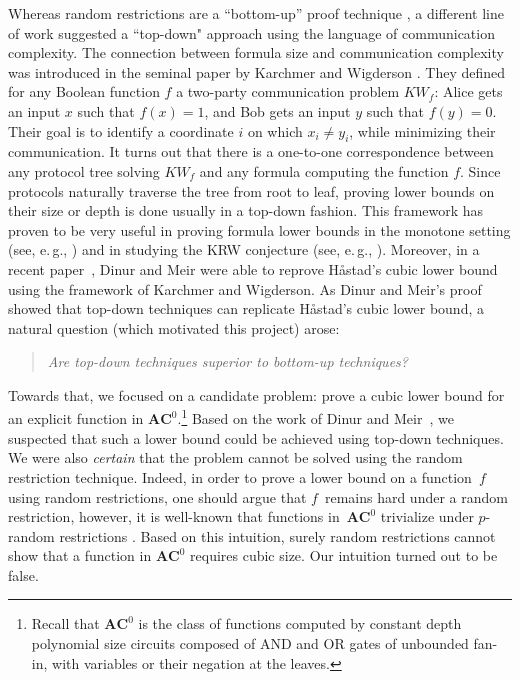 \documentclass[11pt]{article}
\numberwithin{equation}{section}
\theoremstyle{definition}
\theoremstyle{plain}
\newcommand{\eg}{e.\,g.}
\theoremstyle{definition}\newtheorem{notation}[theorem]{Notation}\theoremstyle{plain}
\newcommand{\ACz}{\boldsymbol{AC}^{0}}
\newcommand{\KW}{\mathit{KW}}
\theoremstyle{definition}
\theoremstyle{plain}
\begin{document}
Whereas random restrictions are a ``bottom-up'' proof technique
\cite{HJP95}, a different line of work suggested a ``top-down"
approach using the language of communication complexity. The connection
between formula size and communication complexity was introduced in
the seminal %
paper by %
Karchmer and Wigderson \cite{KW90}. They defined
for any Boolean function $f$ a two-party communication problem $\KW_{f}$:
Alice gets an input $x$ such that $f(x)=1$, and Bob gets an input
$y$ such that $f(y)=0$. Their goal is to identify a coordinate $i$
on which $x_{i}\neq y_{i}$, while minimizing their communication.
It turns out that there is a one-to-one correspondence between any
protocol tree solving $\KW_{f}$ and any formula computing the function
$f$. Since protocols naturally traverse the tree from root to leaf,
proving lower bounds on their size or depth is done usually in a top-down
fashion. This framework has proven to be very useful in proving formula
lower bounds in the monotone setting (see, \eg, \cite{KW90,GH92,RW92,KRW95,RM99,GP18,PR17})
and in studying the KRW conjecture (see, \eg, \cite{KRW95,EIRS01,HW93,GMWW17,DM18,KM18,M20,RMNPR20,MS21}).
Moreover,
%
in a recent paper~\cite{DM18}, Dinur and Meir were able to %
reprove H{\aa}stad's cubic lower bound using the framework of Karchmer
and Wigderson. As Dinur and Meir's proof showed that top-down techniques
can replicate H{\aa}stad's cubic lower bound, a natural question
(which motivated this project) arose: 
\begin{quote}
\emph{Are top-down techniques superior to bottom-up techniques?} 
\end{quote}
Towards that, we focused on a candidate problem: prove a cubic lower
bound for an explicit function in $\ACz$.\footnote{Recall that $\ACz$ is the class of functions computed by constant
depth polynomial size circuits composed of AND and OR gates of unbounded
fan-in, with variables or their negation at the leaves.} Based on the 
work of Dinur and Meir~\cite{DM18}, we suspected that
such a lower bound could be achieved using top-down techniques. We
were also \emph{certain} that the problem cannot be solved using the
random restriction technique. Indeed, in order to prove a lower bound
on a function~$f$ using random restrictions, one should argue that
$f$~remains hard under a random restriction, however, it is well-known
that functions in~$\ACz$ trivialize under $p$-random restrictions
\cite{A83,FSS84,Y85,H86}. Based on this intuition, surely random
restrictions cannot show that a function in $\ACz$ requires cubic
size. Our intuition turned out to be false.
\end{document}
